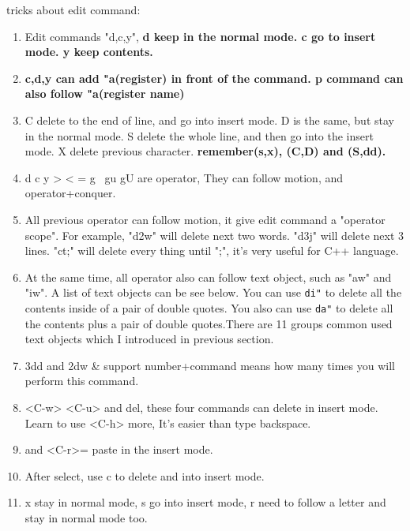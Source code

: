 \documentclass[paper=8.5in:11in, twoside, 12pt, pagesize=pdftex]{book}
\begin{document}
tricks about edit command: 
		\begin{enumerate} 
			\item  Edit commands "d,c,y", \textbf{d keep in the normal mode. c go to insert mode. y keep contents.} 
			
			\item \textbf{c,d,y can add "a(register) in front of the command. p command can also follow "a(register name)}
			
			\item C delete to the end of line, and go into insert mode. D is the same, but stay in the normal mode. S delete the whole line, and then go into the insert mode. X delete previous character. \textbf{remember(s,x), (C,D) and (S,dd).}
			
			\item d c y > < = g~ gu gU are operator, They can follow motion, and operator+conquer.
			
			\item All previous operator can follow motion, it give edit command a "operator scope". For example, "d2w" will delete next two words. "d3j" will delete next 3 lines. "ct;" will delete every thing until ";", it's very useful for C++ language. 
			
			\item  At the same time, all operator also can follow text object, such as "aw" and "iw". A list of text objects can be see below.  You can use \verb=di"= to delete all the contents inside of a pair of double quotes. You also can use \verb=da"= to delete all the contents plus a pair of double quotes.There are 11 groups common used text objects which I introduced in previous section. 
			
			
			\item 3dd and 2dw   \& support number+command means how many times you will perform this command.
			
			\item <C-h> <C-w> <C-u> and del, these four commands can delete in insert mode. Learn to use <C-h> more, It's easier than type backspace.
			
			\item <C-r> and <C-r>= paste in the insert mode.
			
			\item After select, use c to delete and into insert mode.
			
			\item x stay in normal mode, s go into insert mode, r need to follow a letter and stay in normal mode too.
			

\end{enumerate}
\end{document}
